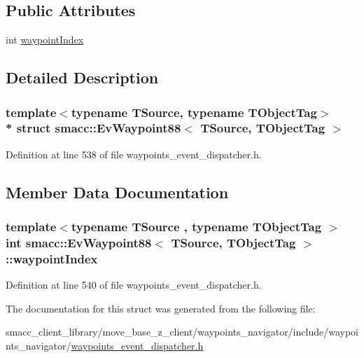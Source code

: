 \subsection*{Public Attributes}
\begin{DoxyCompactItemize}
\item 
int \hyperlink{structsmacc_1_1EvWaypoint88_a24a61a5779ac9d0391333e47bf74b6db}{waypoint\+Index}
\end{DoxyCompactItemize}


\subsection{Detailed Description}
\subsubsection*{template$<$typename T\+Source, typename T\+Object\+Tag$>$\\*
struct smacc\+::\+Ev\+Waypoint88$<$ T\+Source, T\+Object\+Tag $>$}



Definition at line 538 of file waypoints\+\_\+event\+\_\+dispatcher.\+h.



\subsection{Member Data Documentation}
\subsubsection[{\texorpdfstring{waypoint\+Index}{waypointIndex}}]{\setlength{\rightskip}{0pt plus 5cm}template$<$typename T\+Source , typename T\+Object\+Tag $>$ int {\bf smacc\+::\+Ev\+Waypoint88}$<$ T\+Source, T\+Object\+Tag $>$\+::waypoint\+Index}\hypertarget{structsmacc_1_1EvWaypoint88_a24a61a5779ac9d0391333e47bf74b6db}{}\label{structsmacc_1_1EvWaypoint88_a24a61a5779ac9d0391333e47bf74b6db}


Definition at line 540 of file waypoints\+\_\+event\+\_\+dispatcher.\+h.



The documentation for this struct was generated from the following file\+:\begin{DoxyCompactItemize}
\item 
smacc\+\_\+client\+\_\+library/move\+\_\+base\+\_\+z\+\_\+client/waypoints\+\_\+navigator/include/waypoints\+\_\+navigator/\hyperlink{waypoints__event__dispatcher_8h}{waypoints\+\_\+event\+\_\+dispatcher.\+h}\end{DoxyCompactItemize}
